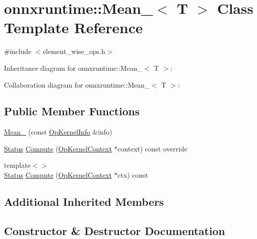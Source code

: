 \hypertarget{classonnxruntime_1_1Mean__6}{}\section{onnxruntime\+:\+:Mean\+\_$<$ T $>$ Class Template Reference}
\label{classonnxruntime_1_1Mean__6}


{\ttfamily \#include $<$element\+\_\+wise\+\_\+ops.\+h$>$}



Inheritance diagram for onnxruntime\+:\+:Mean\+\_$<$ T $>$\+:


Collaboration diagram for onnxruntime\+:\+:Mean\+\_$<$ T $>$\+:
\subsection*{Public Member Functions}
\begin{DoxyCompactItemize}
\item 
\mbox{\hyperlink{classonnxruntime_1_1Mean__6_a0b66e446dd8c1877feaa4077ad238c94}{Mean\+\_}} (const \mbox{\hyperlink{classonnxruntime_1_1OpKernelInfo}{Op\+Kernel\+Info}} \&info)
\item 
\mbox{\hyperlink{classonnxruntime_1_1common_1_1Status}{Status}} \mbox{\hyperlink{classonnxruntime_1_1Mean__6_ab7d4eac2311682e6a4390bda625e1afd}{Compute}} (\mbox{\hyperlink{classonnxruntime_1_1OpKernelContext}{Op\+Kernel\+Context}} $\ast$context) const override
\item 
{\footnotesize template$<$$>$ }\\\mbox{\hyperlink{classonnxruntime_1_1common_1_1Status}{Status}} \mbox{\hyperlink{classonnxruntime_1_1Mean__6_ad86f8f70fa1c945aff65709b0ce162bf}{Compute}} (\mbox{\hyperlink{classonnxruntime_1_1OpKernelContext}{Op\+Kernel\+Context}} $\ast$ctx) const
\end{DoxyCompactItemize}
\subsection*{Additional Inherited Members}


\subsection{Constructor \& Destructor Documentation}
\mbox{\label{classonnxruntime_1_1Mean__6_a0b66e446dd8c1877feaa4077ad238c94}} 
